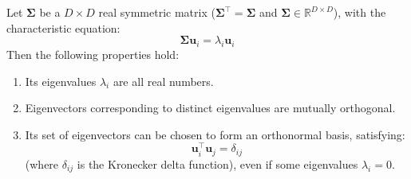 \documentclass[../main.tex]{subfiles}
\begin{document}
\begin{yellow}
\begin{theorem}
\label{thm:real_symmetric_matrix_properties}
Let $\boldsymbol{\Sigma}$ be a $D \times D$ real symmetric matrix ($\boldsymbol{\Sigma}^\top = \boldsymbol{\Sigma}$ and $\boldsymbol{\Sigma} \in \mathbb{R}^{D \times D}$), with the characteristic equation:
\begin{equation}
\boldsymbol{\Sigma} \mathbf{u}_i = \lambda_i \mathbf{u}_i
\end{equation}
Then the following properties hold:
\begin{enumerate}
    \item Its eigenvalues $\lambda_i$ are all real numbers.
    \item Eigenvectors corresponding to distinct eigenvalues are mutually orthogonal.
    \item Its set of eigenvectors can be chosen to form an orthonormal basis, satisfying:
    \begin{equation}
    \mathbf{u}_i^\top \mathbf{u}_j = \delta_{ij}
    \end{equation}
    (where $\delta_{ij}$ is the Kronecker delta function), even if some eigenvalues $\lambda_i = 0$.
\end{enumerate}
\end{theorem}
\end{yellow}
\end{document}
